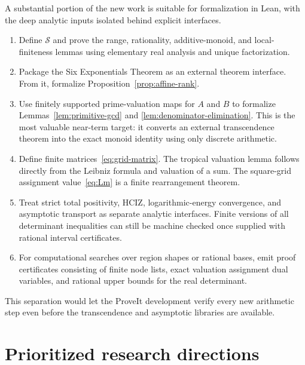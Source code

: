 \documentclass[11pt]{article}
\theoremstyle{definition}
\begin{document}
A substantial portion of the new work is suitable for formalization in Lean,
with the deep analytic inputs isolated behind explicit interfaces.

\begin{enumerate}
\item Define $\mathcal S$ and prove the range, rationality, additive-monoid, and
      local-finiteness lemmas using elementary real analysis and unique
      factorization.
\item Package the Six Exponentials Theorem as an external theorem interface.
      From it, formalize Proposition~\ref{prop:affine-rank}.
\item Use finitely supported prime-valuation maps for $A$ and $B$ to formalize
      Lemmas~\ref{lem:primitive-gcd} and
      \ref{lem:denominator-elimination}.  This is the most valuable near-term
      target: it converts an external transcendence theorem into the exact
      monoid identity using only discrete arithmetic.
\item Define finite matrices~\eqref{eq:grid-matrix}.  The tropical valuation
      lemma follows directly from the Leibniz formula and valuation of a sum.
      The square-grid assignment value~\eqref{eq:Lm} is a finite rearrangement
      theorem.
\item Treat strict total positivity, HCIZ, logarithmic-energy convergence, and
      asymptotic transport as separate analytic interfaces.  Finite versions
      of all determinant inequalities can still be machine checked once
      supplied with rational interval certificates.
\item For computational searches over region shapes or rational bases, emit
      proof certificates consisting of finite node lists, exact valuation
      assignment dual variables, and rational upper bounds for the real
      determinant.
\end{enumerate}

This separation would let the ProveIt development verify every new arithmetic
step even before the transcendence and asymptotic libraries are available.

\section{Prioritized research directions}
\end{document}
